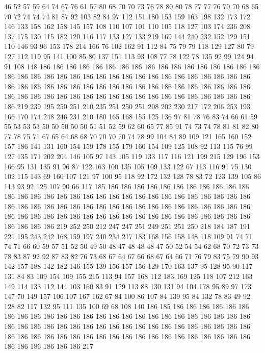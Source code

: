 46 52 57 59 64 74 67 76 61 57 80 68 70 70 73 76 78 80 80 78
77 77 76 70 70 68 65 70 72 74 74 74 81 87 92 103 82 84 97 112
151 180 153 159 163 198 132 173 172 146 133 158 162 158 145 157 108 110 107 101
110 105 118 127 103 174 236 208 137 175 130 115 182 120 116 117 133 127 133 219
169 144 240 232 152 129 151 110 146 93 96 153 178 214 166 76 102 162 91 112
84 75 79 79 118 129 127 80 79 127 112 119 95 141 100 85 80 137 151 113
93 108 77 78 122 78 135 92 99 124 94 91 108 148 186 186 186 186 186 186
186 186 186 186 186 186 186 186 186 186 186 186 186 186 186 186 186 186 186 186
186 186 186 186 186 186 186 186 186 186 186 186 186 186 186 186 186 186 186 186
186 186 186 186 186 186 186 186 186 186 186 186 186 186 186 186 186 186 186 186
186 186 186 186 186 186 186 186 186 219 239 195 250 251 210 235 251 250 251 208
202 230 217 172 206 253 193 166 170 174 248 246 231 210 180 165 168 155 125 136
97 81 78 76 83 74 66 61 59 55 53 53 53 50 50 50 50 50 51 51
52 59 62 60 65 77 85 91 74 73 74 78 81 81 82 80 77 78 75 71
67 65 64 68 68 70 70 70 70 74 78 99 104 84 89 109 121 165 160 152
157 186 141 131 160 154 159 178 155 179 160 154 109 125 108 92 113 115 76 99
127 135 171 202 204 146 105 97 143 105 119 133 117 116 121 199 215 129 196 153
166 95 131 135 91 96 87 122 163 100 135 105 109 133 122 67 113 116 91 75
130 102 115 143 69 160 107 121 97 100 95 118 92 172 132 128 78 83 72 123
139 105 86 113 93 92 125 107 90 66 117 185 186 186 186 186 186 186 186 186
186 186 186 186 186 186 186 186 186 186 186 186 186 186 186 186 186 186 186 186
186 186 186 186 186 186 186 186 186 186 186 186 186 186 186 186 186 186 186 186
186 186 186 186 186 186 186 186 186 186 186 186 186 186 186 186 186 186 186 186
186 186 186 186 219 252 250 212 247 247 251 249 251 251 250 218 184 187 191 221
195 243 242 168 159 197 240 234 217 183 168 156 158 148 118 109 91 74 71 74
71 66 60 59 57 51 52 50 49 50 48 47 48 48 48 47 50 52 54 54
62 68 70 72 73 73 78 83 87 92 92 87 83 82 76 73 68 67 64 67
66 68 67 64 66 71 76 79 83 75 79 90 93 142 157 188 142 182 146 155
139 156 157 156 129 170 163 137 95 128 95 90 117 131 84 83 109 154 109 155
215 113 94 157 168 112 183 169 125 118 107 212 163 149 114 133 112 144 103 160
83 91 129 113 88 130 131 94 104 178 95 89 97 173 147 70 149 157 106 107
167 162 67 84 100 86 107 84 139 95 84 132 78 83 49 92 128 82 117 132
95 111 135 100 69 68 108 140 186 185 186 186 186 186 186 186 186 186 186 186
186 186 186 186 186 186 186 186 186 186 186 186 186 186 186 186 186 186 186 186
186 186 186 186 186 186 186 186 186 186 186 186 186 186 186 186 186 186 186 186
186 186 186 186 186 186 186 186 186 186 186 186 186 186 186 186 186 186 186 217
